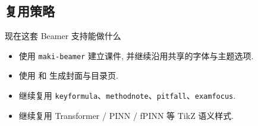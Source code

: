 \documentclass[aspectratio=169,fontpreset=common,theme=cobalt,layout=splitbar]{maki-beamer}
\begin{document}
\subsection{复用策略}

\begin{frame}[t]{现在这套 Beamer 支持能做什么}
  \begin{examfocus}[落地接口]
    \begin{itemize}
      \item 使用 \texttt{maki-beamer} 建立课件, 并继续沿用共享的字体与主题选项.
      \item 使用 \texttt{\string\MakeTitlePage} 和 \texttt{\string\makeoutline[标题]} 生成封面与目录页.
      \item 继续复用 \texttt{keyformula}、\texttt{methodnote}、\texttt{pitfall}、\texttt{examfocus}.
      \item 继续复用 Transformer / PINN / fPINN 等 TikZ 语义样式.
    \end{itemize}
  \end{examfocus}
\end{frame}
\end{document}
